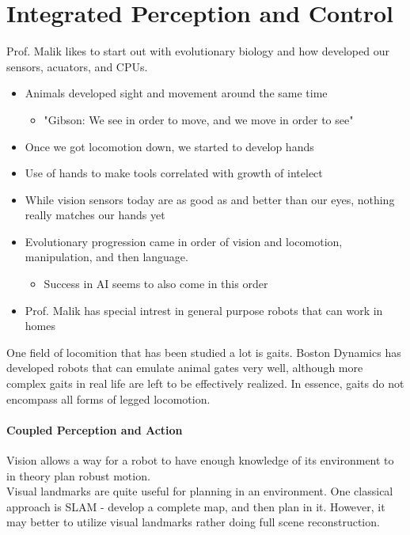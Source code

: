 \documentclass{report}
\begin{document}
\section{Integrated Perception and Control}
Prof. Malik likes to start out with evolutionary biology and how developed our sensors, acuators, and CPUs.
\begin{itemize}
    \item Animals developed sight and movement around the same time
    \begin{itemize}
        \item "Gibson: We see in order to move, and we move in order to see"
    \end{itemize}
    \item Once we got locomotion down, we started to develop hands
    \item Use of hands to make tools correlated with growth of intelect
    \item While vision sensors today are as good as and better than our eyes, nothing really matches our hands yet
    \item Evolutionary progression came in order of vision and locomotion, manipulation, and then language.
    \begin{itemize}
        \item Success in AI seems to also come in this order
    \end{itemize}
    \item Prof. Malik has special intrest in general purpose robots that can work in homes
\end{itemize}

One field of locomition that has been studied a lot is gaits. Boston Dynamics has developed robots that can emulate animal gates very well, although more complex gaits in real life are left to be effectively realized. In essence, gaits do not encompass all forms of legged locomotion.

\paragraph{Coupled Perception and Action}
Vision allows a way for a robot to have enough knowledge of its environment to in theory plan robust motion.\\

Visual landmarks are quite useful for planning in an environment.
One classical approach is SLAM - develop a complete map, and then plan in it.
However, it may better to utilize visual landmarks rather doing full scene reconstruction. \\
\end{document}
